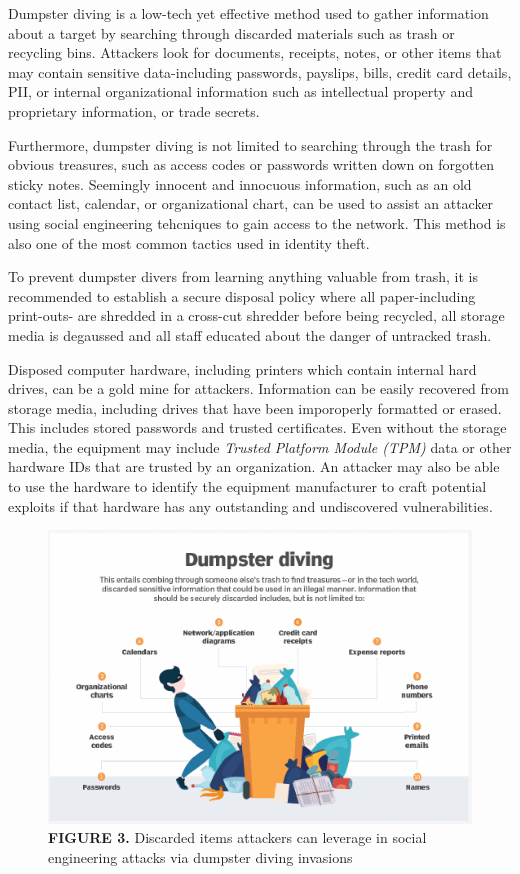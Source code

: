{Dumpster diving is a low-tech yet effective method used to gather information about a target by searching through discarded materials such as trash or recycling bins. Attackers look for documents, receipts, notes, or other items that may contain sensitive data-including passwords, payslips, bills, credit card details, PII, or internal organizational information such as intellectual property and proprietary information, or trade secrets.

Furthermore, dumpster diving is not limited to searching through the trash for obvious treasures, such as access codes or passwords written down on forgotten sticky notes. Seemingly innocent and innocuous information, such as an old contact list, calendar, or organizational chart, can be used to assist an attacker using social engineering tehcniques to gain access to the network. This method is also one of the most common tactics used in identity theft.

To prevent dumpster divers from learning anything valuable from trash, it is recommended to establish a secure disposal policy where all paper-including print-outs- are shredded in a cross-cut shredder before being recycled, all storage media is degaussed and all staff educated about the danger of untracked trash.

Disposed computer hardware, including printers which contain internal hard drives, can be a gold mine for attackers. Information can be easily recovered from storage media, including drives that have been imporoperly formatted or erased. This includes stored passwords and trusted certificates. Even without the storage media, the equipment may include \textit{Trusted Platform Module (TPM)} data or other hardware IDs that are trusted by an organization. An attacker may also be able to use the hardware to identify the equipment manufacturer to craft potential exploits if that hardware has any outstanding and undiscovered vulnerabilities.

\begin{figure}
    \centering
    \includegraphics[width=0.75\linewidth]{dditems.png}
    \caption{\textbf{FIGURE 3. }Discarded items attackers can leverage in social engineering attacks via dumpster diving invasions}
    \label{fig:placeholder}
\end{figure}

}
